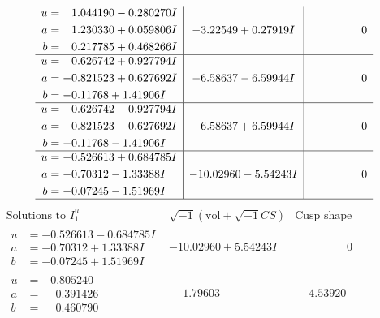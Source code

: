 \documentclass[1p]{elsarticle_modified}
\theoremstyle{definition}
\newcommand{\I}{\sqrt{-1}}
\begin{document}
$$\begin{array}{c|c|c}
\begin{aligned}
u &= \phantom{-}1.044190 - 0.280270 I \\
a &= \phantom{-}1.230330 + 0.059806 I \\
b &= \phantom{-}0.217785 + 0.468266 I\end{aligned}
 & -3.22549 + 0.27919 I & \phantom{-0.000000 } 0 \\ \hline\begin{aligned}
u &= \phantom{-}0.626742 + 0.927794 I \\
a &= -0.821523 + 0.627692 I \\
b &= -0.11768 + 1.41906 I\end{aligned}
 & -6.58637 - 6.59944 I & \phantom{-0.000000 } 0 \\ \hline\begin{aligned}
u &= \phantom{-}0.626742 - 0.927794 I \\
a &= -0.821523 - 0.627692 I \\
b &= -0.11768 - 1.41906 I\end{aligned}
 & -6.58637 + 6.59944 I & \phantom{-0.000000 } 0 \\ \hline\begin{aligned}
u &= -0.526613 + 0.684785 I \\
a &= -0.70312 - 1.33388 I \\
b &= -0.07245 - 1.51969 I\end{aligned}
 & -10.02960 - 5.54243 I & \phantom{-0.000000 } 0\\
 \hline 
 \end{array}$$\newpage$$\begin{array}{c|c|c}  
\text{Solutions to }I^u_{1}& \I (\text{vol} + \sqrt{-1}CS) & \text{Cusp shape}\\
 \hline 
\begin{aligned}
u &= -0.526613 - 0.684785 I \\
a &= -0.70312 + 1.33388 I \\
b &= -0.07245 + 1.51969 I\end{aligned}
 & -10.02960 + 5.54243 I & \phantom{-0.000000 } 0 \\ \hline\begin{aligned}
u &= -0.805240\phantom{ +0.000000I} \\
a &= \phantom{-}0.391426\phantom{ +0.000000I} \\
b &= \phantom{-}0.460790\phantom{ +0.000000I}\end{aligned}
 & \phantom{-}1.79603\phantom{ +0.000000I} & \phantom{-}4.53920\phantom{ +0.000000I} \\ \hline\begin{aligned}

\end{aligned}
\end{array}$$
\end{document}

